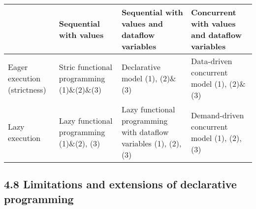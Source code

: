 \begin{table}[!h]
  \begin{tabular}{|p{}|p{}|p{}|p{}|}
    \hline
    & Sequential with values
    & Sequential with values and dataflow variables
    & Concurrent with values and dataflow variables\\
    \hline
    Eager execution (strictness)
    & Stric functional programming
    (1)\&(2)\&(3)
    & Declarative model
    (1), (2)\&(3)
    & Data-driven concurrent model
    (1), (2)\&(3)\\
    \hline
    Lazy execution
    & Lazy functional programming
    (1)\&(2), (3)
    & Lazy functional programming with dataflow variables
    (1), (2), (3)
    & Demand-driven concurrent model
    (1), (2), (3)\\
    \hline
  \end{tabular}
\end{table}

\subsection{4.8 Limitations and extensions of declarative programming}

